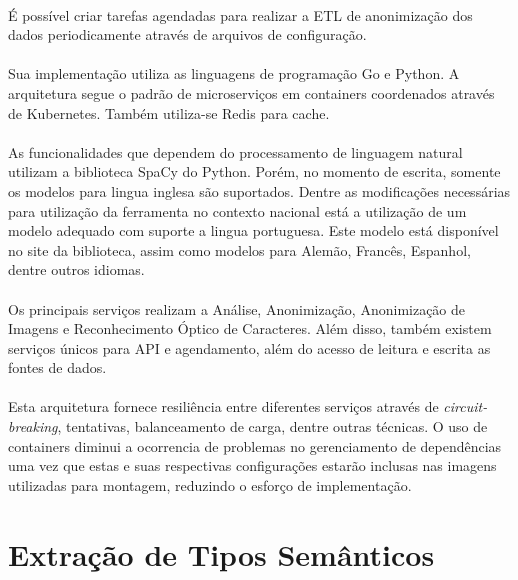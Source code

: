 \paragraph{} É possível criar tarefas agendadas para realizar a ETL de anonimização dos dados periodicamente através de arquivos de configuração.

\paragraph{} Sua implementação utiliza as linguagens de programação Go e Python. A arquitetura segue o padrão de microserviços em containers coordenados através de Kubernetes. Também utiliza-se Redis para cache.

\paragraph{} As funcionalidades que dependem do processamento de linguagem natural utilizam a biblioteca SpaCy do Python. Porém, no momento de escrita, somente
os modelos para lingua inglesa são suportados.\cite{presidio-issue303} Dentre as modificações necessárias para utilização da ferramenta no contexto nacional está a utilização de um modelo
adequado com suporte a lingua portuguesa. Este modelo está disponível no site da biblioteca\cite{spacy}, assim como modelos para Alemão, Francês, Espanhol, dentre outros idiomas.

\paragraph{} Os principais serviços realizam a Análise, Anonimização, Anonimização de Imagens e Reconhecimento Óptico de Caracteres. 
Além disso, também existem serviços únicos para API e agendamento, além do acesso de leitura e escrita as fontes de dados. 

\paragraph{} Esta arquitetura fornece resiliência entre diferentes serviços através de \textit{circuit-breaking}, tentativas, balanceamento de carga, dentre outras técnicas. 
O uso de containers diminui a ocorrencia de problemas no gerenciamento de dependências\cite{merkel2014docker} uma vez que estas e suas respectivas configurações estarão inclusas nas imagens utilizadas para montagem, reduzindo o esforço de implementação.


\section{Extração de Tipos Semânticos}

